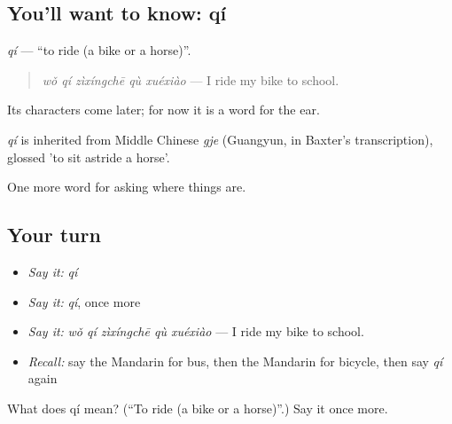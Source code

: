 \subsection*{You'll want to know: qí}
\emph{qí} — \textquotedblleft{}to ride (a bike or a horse)\textquotedblright{}.

\begin{quote}
\emph{wǒ qí zìxíngchē qù xuéxiào} — I ride my bike to school.
\end{quote}

Its characters come later; for now it is a word for the ear.

\begin{cousinweb}
\emph{qí} is inherited from Middle Chinese \emph{gje} (Guangyun, in Baxter's transcription), glossed 'to sit astride a horse'.
\end{cousinweb}

\begin{grammarlens}[title={What you've built}]
One more word for asking where things are.
\end{grammarlens}

\subsection*{Your turn}
\begin{itemize}
\raggedright
  \item \emph{Say it:} \emph{qí}
  \item \emph{Say it:} \emph{qí}, once more
  \item \emph{Say it:} \emph{wǒ qí zìxíngchē qù xuéxiào} — I ride my bike to school.
  \item \emph{Recall:} say the Mandarin for bus, then the Mandarin for bicycle, then say \emph{qí} again
\end{itemize}

\begin{tcolorbox}[breakable,colback=teal!4,colframe=teal!35!black,title={Before you move on}]
What does qí mean? (\textquotedblleft{}To ride (a bike or a horse)\textquotedblright{}.) Say it once more.
\end{tcolorbox}
